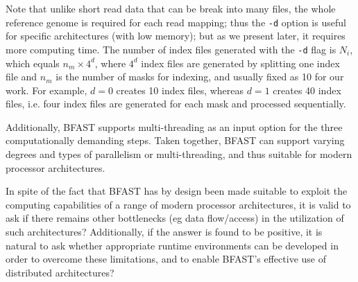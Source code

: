 \documentclass{cpeauth}
\begin{document}
Note that unlike short read data that can be break into many files,
the whole reference genome is required for each read mapping; thus the
\texttt{-d} option is useful for specific architectures (with low
memory); but as we present later, it requires more computing time.
The number of index files generated with the \texttt{-d} flag is
$N_i$, which equals $n_m \times 4^d$, where $4^d$ index files are
generated by splitting one index file and $n_m$ is the number of masks
for indexing, and usually fixed as 10 for our work.  For example,
$d=0$ creates 10 index files, whereas $d=1$ creates 40 index files,
i.e. four index files are generated for each mask and processed
sequentially.

Additionally, BFAST supports multi-threading as an input option for
the three computationally demanding steps.  Taken together, BFAST can
support varying degrees and types of parallelism or multi-threading,
and thus suitable for modern processor architectures.




In spite of the fact that BFAST has by design been made suitable to
exploit the computing capabilities of a range of modern processor
architectures, it is valid to ask if there remains other bottlenecks
(eg data flow/access) in the utilization of such architectures?
Additionally, if the answer is found to be positive, it is natural to
ask whether appropriate runtime environments can be developed in order
to overcome these limitations, and to enable BFAST's effective use of
distributed architectures?


\end{document}

